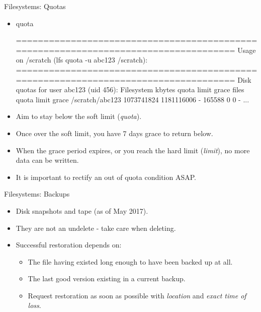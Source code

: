 \begin{frame}[fragile]{Filesystems: Quotas}
\begin{itemize}
\item{quota}
\begin{semiverbatim}
\tiny
====================================================================================
Usage on /scratch (lfs quota -u abc123 /scratch):
====================================================================================
Disk quotas for user abc123 (uid 456):
      Filesystem  kbytes   quota   limit   grace   files   quota   limit   grace
 /scratch/abc123   1073741824 1181116006   -   165588       0       0       -
...
\end{semiverbatim}
\item<1-|handout:1->{\alert{Aim to stay below the soft limit (\emph{quota}).}}
\item<2-|handout:1->{\alert{Once over the soft limit, you have 7 days grace to return below.}}
\item<3-|handout:2>{\alert{When the grace period expires, or you reach the hard limit (\emph{limit}), no more data can be written.}}
\item<4-|handout:2>{\alert{It is important to rectify an out of quota condition ASAP.}}
\end{itemize}
\end{frame}

\begin{frame}{Filesystems: Backups}
\begin{itemize}
\item<1->{Disk snapshots and tape (as of May 2017).}
\item<2->{{\color{red}They are not an undelete - take care when deleting.}}
\item<3->{Successful restoration depends on:}
\begin{itemize}
\item{The file having existed long enough to have been backed up at all.}
\item{The last good version existing in a current backup.}
\item<4->{\color{red}Request restoration as soon as possible with \emph{location} and \emph{exact time of loss}.}
\medskip
{}
\end{itemize}
\end{itemize}
\end{frame}

